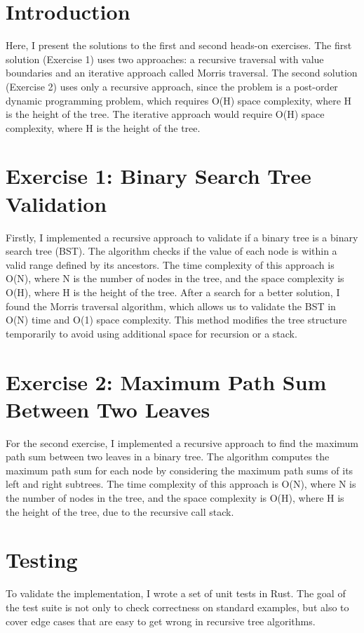 \documentclass[11pt,a4paper]{article}
\begin{document}
\newpage
\section*{Introduction}
Here, I present the solutions to the first and second heads-on exercises. The first solution (Exercise 1) uses two approaches: a recursive traversal with value boundaries and an iterative approach called Morris traversal. The second solution (Exercise 2) uses only a recursive approach, since the problem is a post-order dynamic programming problem, which requires O(H) space complexity, where H is the height of the tree. The iterative approach would require O(H) space complexity, where H is the height of the tree.
\section*{Exercise 1: Binary Search Tree Validation}
Firstly, I implemented a recursive approach to validate if a binary tree is a binary search tree (BST). The algorithm checks if the value of each node is within a valid range defined by its ancestors. The time complexity of this approach is O(N), where N is the number of nodes in the tree, and the space complexity is O(H), where H is the height of the tree.
After a search for a better solution, I found the Morris traversal algorithm, which allows us to validate the BST in O(N) time and O(1) space complexity. This method modifies the tree structure temporarily to avoid using additional space for recursion or a stack.
\section*{Exercise 2: Maximum Path Sum Between Two Leaves}
For the second exercise, I implemented a recursive approach to find the maximum path sum between two leaves in a binary tree. The algorithm computes the maximum path sum for each node by considering the maximum path sums of its left and right subtrees. The time complexity of this approach is O(N), where N is the number of nodes in the tree, and the space complexity is O(H), where H is the height of the tree, due to the recursive call stack.
\section*{Testing}
To validate the implementation, I wrote a set of unit tests in Rust. The goal of the test suite is not only to check correctness on standard examples, but also to cover edge cases that are easy to get wrong in recursive tree algorithms.
\end{document}
